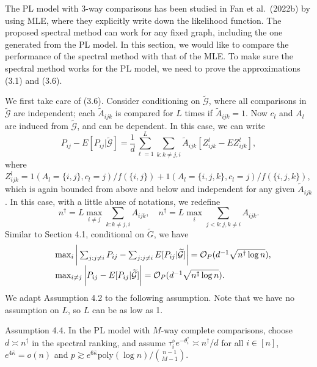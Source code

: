 The PL model with 3-way comparisons has been studied in Fan et al.~(2022b) by using MLE, where they explicitly write down the likelihood function. The proposed spectral method can work for any fixed graph, including the one generated from the PL model. In this section, we would like to compare the performance of the spectral method with that of the MLE. To make sure the spectral method works for the PL model, we need to prove the approximations (3.1) and (3.6).

We first take care of (3.6). Consider conditioning on \(\widetilde{\mathcal{G}}\), where all comparisons in \(\widetilde{\mathcal{G}}\) are independent; each \(\widetilde{A}_{ijk}\) is compared for \(L\) times if \(\widetilde{A}_{ijk} = 1\). Now \(c_{l}\) and \(A_{l}\) are induced from \(\widetilde{\mathcal{G}}\), and can be dependent. In this case, we can write
\[
P_{ij} - E[P_{ij}|\widetilde{\mathcal{G}} ] = \frac{1}{d}\sum_{\ell = 1}^{L}\sum_{k:k\neq j,i}\widetilde{A}_{ijk}[Z_{ijk}^{l} - EZ_{ijk}^{l}],
\]
where \(Z_{ijk}^{l} = 1(A_{l} = \{i,j\} ,c_{l} = j) / f(\{i,j\}) + 1(A_{l} = \{i,j,k\} ,c_{l} = j) / f(\{i,j,k\})\), which is again bounded from above and below and independent for any given \(\widetilde{A}_{ijk}\). In this case, with a little abuse of notations, we redefine
\[
n^{\dagger} = L\max_{i\neq j}\sum_{k:k\neq j,i}A_{ijk},\quad n^{\dagger} = L\max_{i}\sum_{j< k:j,k\neq i}A_{ijk}.
\]
Similar to Section 4.1, conditional on \(\widetilde{G}\), we have
\[
\begin{array}{r l} & {\max_{i}\bigg|\sum_{j:j\neq i}P_{i j} - \sum_{j:j\neq i}E[P_{i j}|\widetilde{\mathcal{G}} ]\bigg| = \mathcal{O}_{P}(d^{-1}\sqrt{n^{\dagger}\log n}),}\\ & {\max_{i\neq j}\bigg|P_{ij} - E[P_{ij}|\widetilde{\mathcal{G}}]\bigg| = \mathcal{O}_{P}(d^{-1}\sqrt{n^{\ddagger}\log n}).}
\end{array}
\]
We adapt Assumption 4.2 to the following assumption. Note that we have no assumption on \(L\), so \(L\) can be as low as 1.

Assumption 4.4. In the PL model with \(M\)-way complete comparisons, choose \(d\asymp n^{\dagger}\) in the spectral ranking, and assume \(\tau_{i}^{\diamond}e^{- \theta_{i}^{*}}\asymp n^{\dagger} / d\) for all \(i\in [n]\), \(e^{4\bar{\kappa}} = o(n)\) and \(p\gtrsim e^{6\bar{\kappa}}\mathrm{poly}(\log n) / \binom{n- 1}{M- 1}\).

